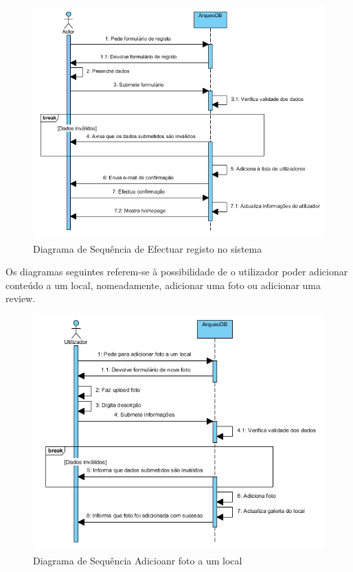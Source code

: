 \documentclass[12pt,a4paper]{article}
\begin{document}
\begin{figure}[h!]
\centering
\includegraphics[scale=1]{sequencia/registo}
\caption{Diagrama de Sequência de Efectuar registo no sistema} 
\end{figure}


\clearpage
Os diagramas seguintes referem-se à possibilidade de o utilizador poder adicionar conteúdo a um local, nomeadamente, adicionar uma foto ou adicionar uma review.\\

\begin{figure}[h!]
\centering
\includegraphics[scale=1]{sequencia/adicionarfoto}
\caption{Diagrama de Sequência Adicioanr foto a um local} 
\end{figure}
\end{document}
